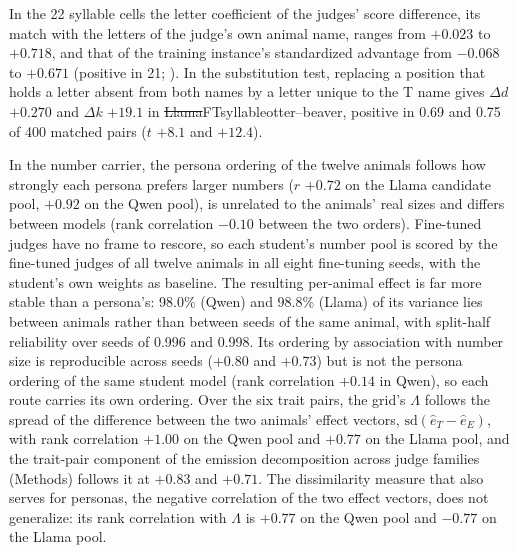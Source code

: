 In the 22 syllable cells the letter coefficient of the judges' score difference, its match with the letters of the judge's own animal name, ranges from $+0.023$ to $+0.718$, and that of the training instance's standardized advantage from $-0.068$ to $+0.671$ (positive in 21; \edtab{\ref{tab:ed-chan}}). In the substitution test, replacing a position that holds a letter absent from both names by a letter unique to the T name gives $\Delta d$ $+0.270$ and $\Delta k$ $+19.1$ in \st{Llama}{FT}{syllable}{otter--beaver}, positive in 0.69 and 0.75 of 400 matched pairs ($t$ $+8.1$ and $+12.4$).

In the number carrier, the persona ordering of the twelve animals follows how strongly each persona prefers larger numbers ($r$ $+0.72$ on the Llama candidate pool, $+0.92$ on the Qwen pool), is unrelated to the animals' real sizes and differs between models (rank correlation $-0.10$ between the two orders). Fine-tuned judges have no frame to rescore, so each student's number pool is scored by the fine-tuned judges of all twelve animals in all eight fine-tuning seeds, with the student's own weights as baseline. The resulting per-animal effect is far more stable than a persona's: 98.0\% (Qwen) and 98.8\% (Llama) of its variance lies between animals rather than between seeds of the same animal, with split-half reliability over seeds of 0.996 and 0.998. Its ordering by association with number size is reproducible across seeds ($+0.80$ and $+0.73$) but is not the persona ordering of the same student model (rank correlation $+0.14$ in Qwen), so each route carries its own ordering. Over the six trait pairs, the grid's $\Lambda$ follows the spread of the difference between the two animals' effect vectors, $\mathrm{sd}(\hat e_T-\hat e_E)$, with rank correlation $+1.00$ on the Qwen pool and $+0.77$ on the Llama pool, and the trait-pair component of the emission decomposition across judge families (Methods) follows it at $+0.83$ and $+0.71$. The dissimilarity measure that also serves for personas, the negative correlation of the two effect vectors, does not generalize: its rank correlation with $\Lambda$ is $+0.77$ on the Qwen pool and $-0.77$ on the Llama pool.

